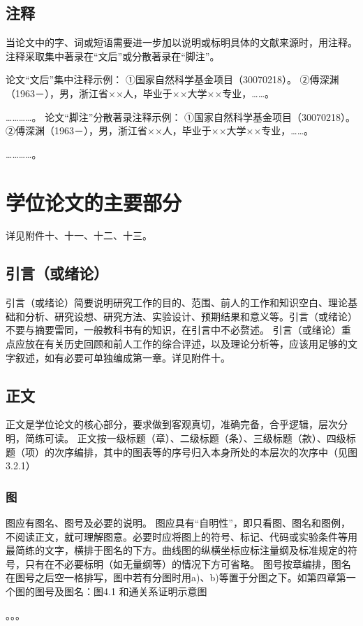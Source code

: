 \subsection{注释}
当论文中的字、词或短语需要进一步加以说明或标明具体的文献来源时，用注释。注释采取集中著录在“文后”或分散著录在“脚注”。

论文“文后”集中注释示例：
①国家自然科学基金项目（30070218）。
②傅深渊（1963－），男，浙江省××人，毕业于××大学××专业，……。 

…………。
论文“脚注”分散著录注释示例：
①国家自然科学基金项目（30070218）。
②傅深渊（1963－），男，浙江省××人，毕业于××大学××专业，……。

…………。

\section{学位论文的主要部分}
详见附件十、十一、十二、十三。

\subsection{引言（或绪论）}
引言（或绪论）简要说明研究工作的目的、范围、前人的工作和知识空白、理论基础和分析、研究设想、研究方法、实验设计、预期结果和意义等。引言（或绪论）不要与摘要雷同，一般教科书有的知识，在引言中不必赘述。
引言（或绪论）重点应放在有关历史回顾和前人工作的综合评述，以及理论分析等，应该用足够的文字叙述，如有必要可单独编成第一章。详见附件十。

\subsection{正文}
正文是学位论文的核心部分，要求做到客观真切，准确完备，合乎逻辑，层次分明，简练可读。
正文按一级标题（章）、二级标题（条）、三级标题（款）、四级标题（项）的次序编排，其中的图表等的序号归入本身所处的本层次的次序中（见图3.2.1）

\subsubsection{图}
图应有图名、图号及必要的说明。
图应具有“自明性”，即只看图、图名和图例，不阅读正文，就可理解图意。必要时应将图上的符号、标记、代码或实验条件等用最简练的文字，横排于图名的下方。曲线图的纵横坐标应标注量纲及标准规定的符号，只有在不必要标明（如无量纲等）的情况下方可省略。
图号按章编排，图名在图号之后空一格排写，图中若有分图时用a)、b)等置于分图之下。如第四章第一个图的图号及图名：图4.1 和通关系证明示意图

。。。

